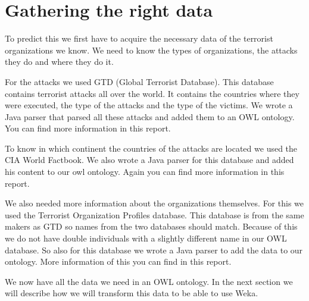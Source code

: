\documentclass[a4]{article}
\begin{document}
\section{Gathering the right data}
\label{sec:gathering_data}
To predict this we first have to acquire the necessary data of the terrorist organizations we know. We need to know the types of organizations, the attacks they do and where they do it.\par
For the attacks we used GTD (Global Terrorist Database)\cite{gtd}. This database contains terrorist attacks all over the world. It contains the countries where they were executed, the type of the attacks and the type of the victims. We wrote a Java parser that parsed all these attacks and added them to an OWL ontology. You can find more information in this\cite{homework2} report.\par To know in which continent the countries of the attacks are located we used the CIA World Factbook\cite{factbook}. We also wrote a Java parser for this database and added his content to our owl ontology. Again you can find more information in this\cite{homework2} report.\par
We also needed more information about the organizations themselves. For this we used the Terrorist Organization Profiles database\cite{start}. This database is from the same makers as GTD so names from the two databases should match. Because of this we do not have double individuals with a slightly different name in our OWL database. So also for this database we wrote a Java parser to add the data to our ontology. More information of this you can find in this\cite{homework3} report.\par
We now have all the data we need in an OWL ontology. In the next section we will describe how we will transform this data to be able to use Weka.
\end{document}
